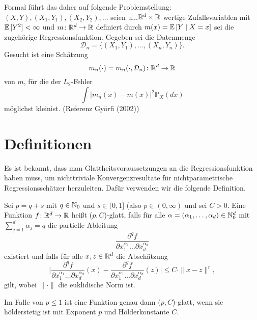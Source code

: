 Formal führt das daher auf folgende Problemstellung$\colon$
$(X, Y), (X_1, Y_1), (X_2, Y_2), \dots$ seien u.\@i.\@v.\@ $\mathbb{R}^d \times \mathbb{R}$ wertige Zufallsvariablen mit $\mathbb{E}\,[Y^2] < \infty$ und $m\colon\mathbb{R}^d \to \mathbb{R}$ definiert durch $m(x) = \mathbb{E}\,[Y \mid X = x]$ sei die zugehörige Regressionsfunktion. Gegeben sei die Datenmenge 
$$ \mathcal{D}_n = \{(X_1, Y_1),\dots,(X_n, Y_n)\}.$$
Gesucht ist eine Schätzung 
$$m_n(\cdot) = m_n(\cdot, \mathcal{D}_n)\colon\mathbb{R}^d \to \mathbb{R} $$
von $m$, für die der $L_2$-Fehler 
$$\int |m_n(x) - m(x)|^2 \mathds{P}_X(dx)$$
möglichst \glqq klein\grqq\@ ist. (Referenz Györfi (2002))

\section{Definitionen}
Es ist bekannt, dass man Glattheitsvoraussetzungen an die Regressionsfunktion haben muss, um nichttriviale Konvergenzresultate für nichtparametrische Regressionsschätzer herzuleiten. Dafür verwenden wir die folgende Definition.
\begin{defn}[($p,C$)-Glattheit]
\label{def:pc}
   Sei $p = q + s$ mit $q \in \mathbb{N}_0$ und $s \in (0,1]$ (also $p \in (0, \infty)$ und sei $C > 0$. Eine Funktion $f\colon \mathbb{R}^d \to \mathbb{R}$ heißt ($p, C$)-glatt, falls für alle $\alpha = (\alpha_1,\dots,\alpha_d) \in \mathbb{N}_0^d$ mit $\sum_{j = 1}^{d}\alpha_j = q$ die partielle Ableitung 
   $$ \frac{\partial^qf}{\partial x_1^{\alpha_1}\dots\partial x_d^{\alpha_d}}$$
   existiert und falls für alle $x, z \in \mathbb{R}^d$ die Abschätzung 
   $$ \bigg|\frac{\partial^qf}{\partial x_1^{\alpha_1}\dots\partial x_d^{\alpha_d}}(x) - \frac{\partial^qf}{\partial x_1^{\alpha_1}\dots\partial x_d^{\alpha_d}}(z) \bigg| \leq C \cdot \|x - z\|^r,$$
   gilt, wobei $\|\cdot\|$ die euklidische Norm ist.  
\end{defn}
\begin{bemnumber}
Im Falle von $p \leq 1$ ist eine Funktion genau dann ($p, C$)-glatt, wenn sie hölderstetig ist mit Exponent $p$ und Hölderkonstante $C$.
\end{bemnumber}



